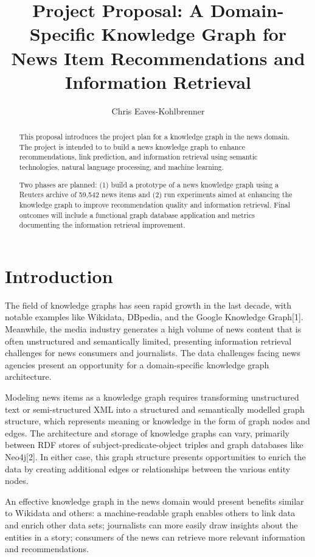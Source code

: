 \documentclass[11pt]{article}   	%
\title{Project Proposal: A Domain-Specific Knowledge Graph for News Item Recommendations and Information Retrieval}
\author{Chris Eaves-Kohlbrenner}
\begin{document}
\maketitle

\begin{abstract}
This proposal introduces the project plan for a knowledge graph in the news domain. The project is intended to to build a news knowledge graph to enhance recommendations, link prediction, and information retrieval using semantic technologies, natural language processing, and machine learning.

Two phases are planned: (1) build a prototype of a news knowledge graph using a Reuters archive of 59,542 news items and (2) run experiments aimed at enhancing the knowledge graph to improve recommendation quality and information retrieval. Final outcomes will include a functional graph database application and metrics documenting the information retrieval improvement.
\end{abstract}

\tableofcontents

\section{Introduction}
The field of knowledge graphs has seen rapid growth in the last decade, with notable examples like Wikidata, DBpedia, and the Google Knowledge Graph[1]. Meanwhile, the media industry generates a high volume of news content that is often unstructured and semantically limited, presenting information retrieval challenges for news consumers and journalists. The data challenges facing news agencies present an opportunity for a domain-specific knowledge graph architecture. 

Modeling news items as a knowledge graph requires transforming unstructured text or semi-structured XML into a structured and semantically modelled graph structure, which represents meaning or knowledge in the form of graph nodes and edges. The architecture and storage of knowledge graphs can vary, primarily between RDF stores of subject-predicate-object triples and graph databases like Neo4j[2]. In either case, this graph structure presents opportunities to enrich the data by creating additional edges or relationships between the various entity nodes.

An effective knowledge graph in the news domain would present benefits similar to Wikidata and others: a machine-readable graph enables others to link data and enrich other data sets; journalists can more easily draw insights about the entities in a story; consumers of the news can retrieve more relevant information and recommendations.
\end{document}
